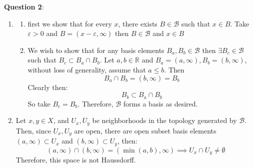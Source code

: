 \documentclass{article} %
\newcommand{\question}[2][]{
  \begin{flushleft}
    \textbf{Question #1}: \textit{#2}

\end{flushleft}}
\begin{document}
\question[2]{}
\begin{enumerate}
  \item
    \begin{enumerate}
      \item first we show that for every $x$, there exists $B \in
        \mathcal{B}$ such that $x \in B$. Take $\varepsilon > 0$ and $B =
        (x - \varepsilon, \infty)$ then $B \in \mathcal{B}$ and $x \in B$
      \item We wish to show that for any basis elements $B_a, B_b \in
        \mathcal{B}$ then $\exists B_c \in \mathcal{B}$ such that $B_c
        \subset B_a \cap B_b$. Let $a, b \in \mathbb{R}$ and $B_a = (a,
        \infty), B_b = (b, \infty)$, without loss of generality, assume
        that $a \leq b$. Then
        \[
          B_a \cap B_b = (b, \infty) = B_b
        \]
        Clearly then:
        \[
          B_b \subset B_a \cap B_b
        \]
        So take $B_c = B_b$. Therefore, $\mathcal{B}$ forms a basis as desired.
    \end{enumerate}
  \item Let $x, y \in X$, and $U_x, U_y$ be neighborhoods in the
    topology generated by $\mathcal{B}$. Then, since $U_x, U_y$ are
    open, there are open subset basis elements $(a, \infty) \subset
    U_x$ and $(b,\infty) \subset U_y$, then:
    \[
      (a, \infty) \cap (b,\infty) = (\min(a,b), \infty) \implies U_x
      \cap U_y \neq \emptyset
    \]
    Therefore, this space is not Haussdorff.
\end{enumerate}
\end{document}
